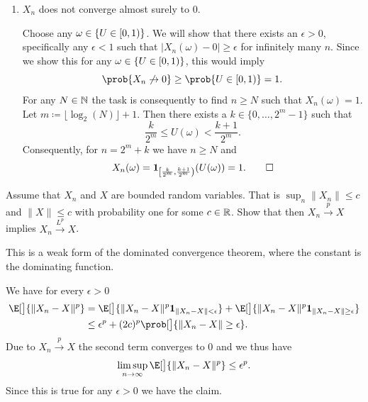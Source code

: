 \begin{exercise}
\begin{enumerate}[label=(\alph*), noitemsep]
        \item \(X_n\) does not converge almost surely to \(0\).
        \begin{solution}
            Choose any \(\omega \in \{U\in [0,1)\}\). We will show that there exists an
            \(\epsilon > 0\), specifically any \(\epsilon < 1\) such that
            \(|X_n(\omega) - 0| \ge \epsilon\) for infinitely many \(n\).
            Since we show this for any \(\omega\in \{U\in [0,1)\}\), this would imply
            \[
                \prob{X_n \not\to 0} \ge \prob{U \in [0,1)} = 1.
            \]
            For any \(N\in \mathbb{N}\) the task is consequently to find \(n\ge N\)
            such that \(X_n(\omega) = 1\). Let \(m \coloneq \lfloor \log_2(N) \rfloor + 1\).
            Then there exists a \(k \in \{0, \ldots, 2^m-1\}\) such that
            \[
                \frac{k}{2^m} \le U(\omega) < \frac{k+1}{2^m}.
            \]
            Consequently, for \(n = 2^m + k\) we have \(n \ge N\) and
            \[
                X_n(\omega) = \ind{\left[
                    \frac{k}{2^{m}}, \frac{k+1}{2^{m}}
                \right)}(U(\omega)) = 1.
                \qedhere
            \]
        \end{solution}
    \end{enumerate}
\end{exercise}

\begin{exercise}
    \label{ex: p to Lp when bounded}
    Assume that \(X_n\) and \(X\) are bounded random variables. That is 
    \(\sup_n\|X_n\| \le c\) and \(\|X\|\le c\) with probability one for some \(c
    \in \mathbb{R}\). Show that then \(X_n \overset{p}\to X\) implies \(X_n
    \overset{L^p}\to X\).
    \begin{remark}
        This is a weak form of the dominated convergence theorem, where the constant
        is the dominating function.
    \end{remark}
    \begin{solution}
        We have for every \(\epsilon > 0\)
        \[\begin{aligned}
            \E[\big]{\norm{X_n - X}^p}
            &= \E[\big]{\norm{X_n - X}^p \ind{\norm{X_n - X} < \epsilon}}
            + \E[\big]{\norm{X_n - X}^p \ind{\norm{X_n - X} \ge \epsilon}}
            \\
            &\le \epsilon^p + (2c)^p \prob[\big]{\norm{X_n - X} \ge \epsilon}.
        \end{aligned}
        \]
        Due to \(X_n \overset{p}\to X\) the second term converges to \(0\)
        and we thus have
        \[
            \limsup_{n\to \infty} \E[\big]{\norm{X_n - X}^p} \le \epsilon^p.
        \]
        Since this is true for any \(\epsilon > 0\) we have the claim.
    \end{solution}
\end{exercise}

